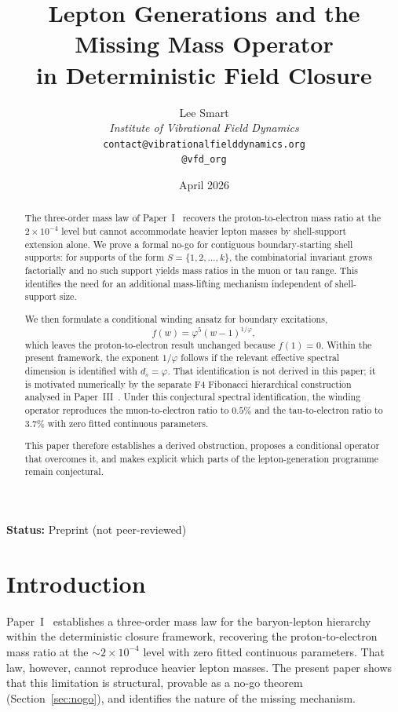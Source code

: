 \documentclass[12pt]{article}
\title{Lepton Generations and the Missing Mass Operator\\in Deterministic Field Closure}
\author{%
  Lee Smart\\[4pt]
  \textit{Institute of Vibrational Field Dynamics}\\[2pt]
  \texttt{contact@vibrationalfielddynamics.org}\\[2pt]
  \texttt{@vfd\_org}%
}
\date{April 2026}
\newcommand{\phig}{\varphi}
\newcommand{\ds}{d_s}
\begin{document}
\maketitle

\noindent\textbf{Status:} Preprint (not peer-reviewed)

\begin{abstract}
The three-order mass law of Paper~I~\citep{SmartI} recovers the proton-to-electron mass ratio at the $2 \times 10^{-4}$ level but cannot accommodate heavier lepton masses by shell-support extension alone. We prove a formal no-go for contiguous boundary-starting shell supports: for supports of the form $S = \{1,2,\ldots,k\}$, the combinatorial invariant grows factorially and no such support yields mass ratios in the muon or tau range. This identifies the need for an additional mass-lifting mechanism independent of shell-support size.

We then formulate a conditional winding ansatz for boundary excitations,
\[
f(w) = \phig^5 (w-1)^{1/\phig},
\]
which leaves the proton-to-electron result unchanged because $f(1)=0$. Within the present framework, the exponent $1/\phig$ follows if the relevant effective spectral dimension is identified with $\ds=\phig$. That identification is not derived in this paper; it is motivated numerically by the separate F4 Fibonacci hierarchical construction analysed in Paper~III~\citep{SmartIII}. Under this conjectural spectral identification, the winding operator reproduces the muon-to-electron ratio to $0.5\%$ and the tau-to-electron ratio to $3.7\%$ with zero fitted continuous parameters.

This paper therefore establishes a derived obstruction, proposes a conditional operator that overcomes it, and makes explicit which parts of the lepton-generation programme remain conjectural.
\end{abstract}

\section{Introduction}\label{sec:intro}

Paper~I~\citep{SmartI} establishes a three-order mass law for the baryon-lepton hierarchy within the deterministic closure framework, recovering the proton-to-electron mass ratio at the $\sim\!2 \times 10^{-4}$ level with zero fitted continuous parameters. That law, however, cannot reproduce heavier lepton masses. The present paper shows that this limitation is structural, provable as a no-go theorem (Section~\ref{sec:nogo}), and identifies the nature of the missing mechanism.
\end{document}
